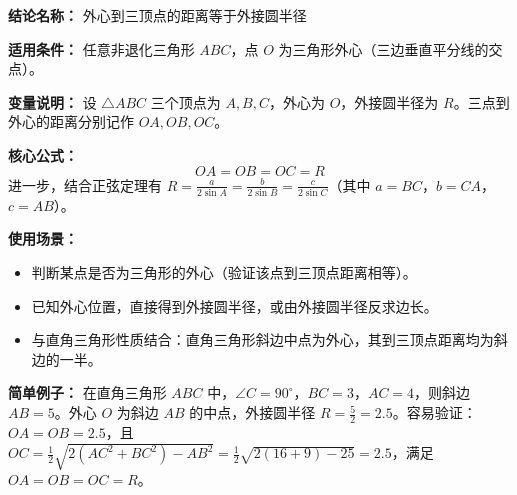 \textbf{结论名称：} 外心到三顶点的距离等于外接圆半径

\textbf{适用条件：} 任意非退化三角形 \(ABC\)，点 \(O\) 为三角形外心（三边垂直平分线的交点）。

\textbf{变量说明：} 设 \(\triangle ABC\) 三个顶点为 \(A,B,C\)，外心为 \(O\)，外接圆半径为 \(R\)。三点到外心的距离分别记作 \(OA,OB,OC\)。

\textbf{核心公式：}
\[
\boxed{OA = OB = OC = R}
\]
进一步，结合正弦定理有 \(\displaystyle R = \frac{a}{2\sin A}=\frac{b}{2\sin B}=\frac{c}{2\sin C}\)（其中 \(a=BC\)，\(b=CA\)，\(c=AB\)）。

\textbf{使用场景：}
\begin{itemize}
  \item 判断某点是否为三角形的外心（验证该点到三顶点距离相等）。
  \item 已知外心位置，直接得到外接圆半径，或由外接圆半径反求边长。
  \item 与直角三角形性质结合：直角三角形斜边中点为外心，其到三顶点距离均为斜边的一半。
\end{itemize}

\textbf{简单例子：} 在直角三角形 \(ABC\) 中，\(\angle C = 90^\circ\)，\(BC = 3\)，\(AC = 4\)，则斜边 \(AB = 5\)。外心 \(O\) 为斜边 \(AB\) 的中点，外接圆半径 \(R = \frac{5}{2} = 2.5\)。容易验证：\(OA = OB = 2.5\)，且 \(OC = \frac{1}{2}\sqrt{2(AC^2 + BC^2) - AB^2} = \frac{1}{2}\sqrt{2(16+9)-25} = 2.5\)，满足 \(OA = OB = OC = R\)。